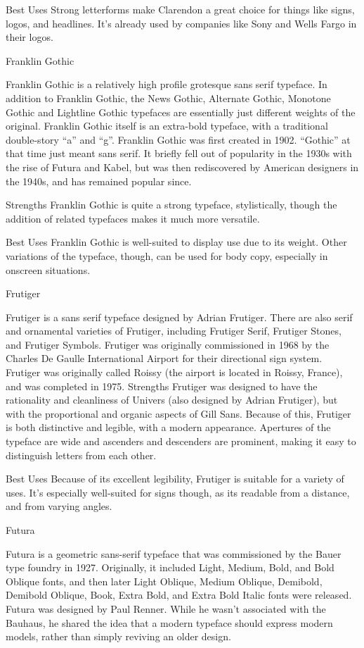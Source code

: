 \documentclass[12pt,a4paper,twocolumn]{book} %
\begin{document}
Best Uses
Strong letterforms make Clarendon a great choice for things like signs, logos, and headlines. It’s already used by companies like Sony and Wells Fargo in their logos.

 
Franklin Gothic

Franklin Gothic is a relatively high profile grotesque sans serif typeface. In addition to Franklin Gothic, the News Gothic, Alternate Gothic, Monotone Gothic and Lightline Gothic typefaces are essentially just different weights of the original. Franklin Gothic itself is an extra-bold typeface, with a traditional double-story “a” and “g”.
Franklin Gothic was first created in 1902. “Gothic” at that time just meant sans serif. It briefly fell out of popularity in the 1930s with the rise of Futura and Kabel, but was then rediscovered by American designers in the 1940s, and has remained popular since.

Strengths
Franklin Gothic is quite a strong typeface, stylistically, though the addition of related typefaces makes it much more versatile.

Best Uses
Franklin Gothic is well-suited to display use due to its weight. Other variations of the typeface, though, can be used for body copy, especially in onscreen situations.

 
Frutiger

Frutiger is a sans serif typeface designed by Adrian Frutiger. There are also serif and ornamental varieties of Frutiger, including Frutiger Serif, Frutiger Stones, and Frutiger Symbols. Frutiger was originally commissioned in 1968 by the Charles De Gaulle International Airport for their directional sign system. Frutiger was originally called Roissy (the airport is located in Roissy, France), and was completed in 1975.
Strengths
Frutiger was designed to have the rationality and cleanliness of Univers (also designed by Adrian Frutiger), but with the proportional and organic aspects of Gill Sans. Because of this, Frutiger is both distinctive and legible, with a modern appearance. Apertures of the typeface are wide and ascenders and descenders are prominent, making it easy to distinguish letters from each other.

Best Uses
Because of its excellent legibility, Frutiger is suitable for a variety of uses. It’s especially well-suited for signs though, as its readable from a distance, and from varying angles.

 
Futura

Futura is a geometric sans-serif typeface that was commissioned by the Bauer type foundry in 1927. Originally, it included Light, Medium, Bold, and Bold Oblique fonts, and then later Light Oblique, Medium Oblique, Demibold, Demibold Oblique, Book, Extra Bold, and Extra Bold Italic fonts were released.
Futura was designed by Paul Renner. While he wasn’t associated with the Bauhaus, he shared the idea that a modern typeface should express modern models, rather than simply reviving an older design.
\end{document}
